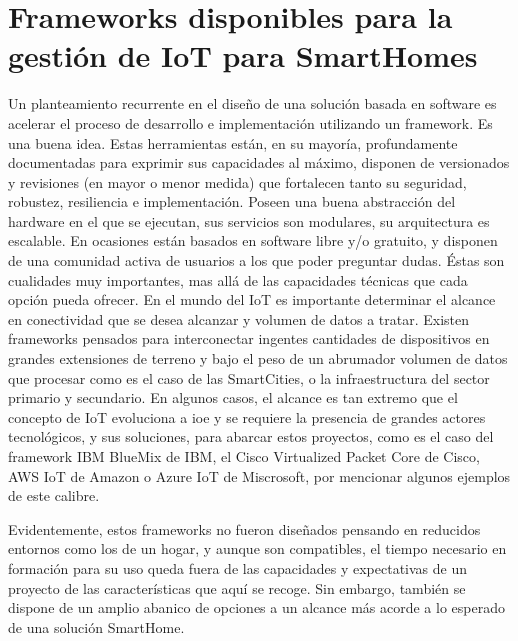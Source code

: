 \section{Frameworks disponibles para la gestión de IoT para SmartHomes}
\label{ch:Capitulo2.2}

Un planteamiento recurrente en el diseño de una solución basada en software es acelerar el proceso de desarrollo e implementación utilizando un framework. Es una buena idea. Estas herramientas están, en su mayoría, profundamente documentadas para exprimir sus capacidades al máximo, disponen de versionados y revisiones (en mayor o menor medida) que fortalecen tanto su seguridad, robustez, resiliencia e implementación. Poseen una buena abstracción del hardware en el que se ejecutan, sus servicios son modulares, su arquitectura es escalable.  En ocasiones están basados en software libre y/o gratuito, y disponen de una comunidad activa de usuarios a los que poder preguntar dudas. Éstas son cualidades muy importantes, mas allá de las capacidades técnicas que cada opción pueda ofrecer.
En el mundo del IoT es importante determinar el alcance en conectividad que se desea alcanzar y volumen de datos a tratar. Existen frameworks pensados para interconectar ingentes cantidades de dispositivos en grandes extensiones de terreno y bajo el peso de un abrumador volumen de datos que procesar como es el caso de las SmartCities, o la infraestructura del sector primario y secundario. En algunos casos, el alcance es tan extremo que el concepto de IoT evoluciona a \gls{ioe} y se requiere la presencia de grandes actores tecnológicos, y sus soluciones, para abarcar estos proyectos, como es el caso del framework IBM BlueMix de IBM, el Cisco Virtualized Packet Core de Cisco, AWS IoT de Amazon o Azure IoT de Miscrosoft, por mencionar algunos ejemplos de este calibre.

\vspace{1.5cm}

Evidentemente, estos frameworks no fueron diseñados pensando en reducidos entornos como los de un hogar, y aunque son compatibles, el tiempo necesario en formación para su uso queda fuera de las capacidades y expectativas de un proyecto de las características que aquí se recoge. Sin embargo, también se dispone de un amplio abanico de opciones a un alcance más acorde a lo esperado de una solución SmartHome.

\vspace{1.5cm}

